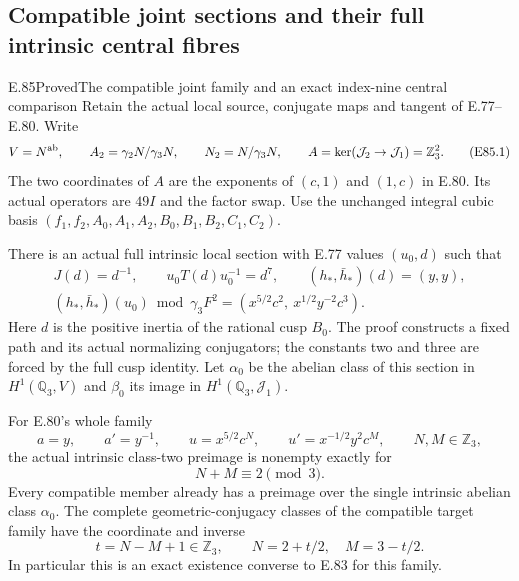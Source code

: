 \subsection{Compatible joint sections and their full intrinsic central fibres}

\begin{statement}{E.85}{Proved}{The compatible joint family and an exact index-nine central comparison}
Retain the actual local source, conjugate maps and
tangent of E.77--E.80. Write
\[
 V=N^{\rm ab},\qquad A_2=\gamma_2N/\gamma_3N,
 \qquad N_2=N/\gamma_3N,\qquad
 A=\ker(\mathcal J_2\to\mathcal J_1)=\mathbb Z_3^2.
 \tag{E85.1}
\]
The two coordinates of $A$ are the exponents of
$(c,1)$ and $(1,c)$ in E.80. Its actual operators
are $49I$ and the factor swap. Use the unchanged
integral cubic basis
$(f_1,f_2,A_0,A_1,A_2,B_0,B_1,B_2,C_1,C_2)$.

There is an actual full intrinsic local section
with E.77 values $(u_0,d)$ such that
\[
 \begin{gathered}
 J(d)=d^{-1},\qquad u_0T(d)u_0^{-1}=d^7,\qquad
 (h_*,\bar h_*)(d)=(y,y),\\
 (h_*,\bar h_*)(u_0)\bmod\gamma_3F^2
       =(x^{5/2}c^2,\ x^{1/2}y^{-2}c^3).
 \end{gathered}
 \tag{E85.2}
\]
Here $d$ is the positive inertia of the rational
cusp $B_0$. The proof constructs a fixed path and
its actual normalizing conjugators; the constants
two and three are forced by the full cusp identity.
Let $\alpha_0$ be the abelian class of this section
in $H^1(\mathbb Q_3,V)$ and $\beta_0$ its image
in $H^1(\mathbb Q_3,\mathcal J_1)$.

For E.80's whole family
\[
 a=y,\qquad a'=y^{-1},\qquad
 u=x^{5/2}c^N,\qquad u'=x^{-1/2}y^2c^M,
                   \qquad N,M\in\mathbb Z_3,
 \tag{E85.3}
\]
the actual intrinsic class-two preimage is nonempty
exactly for
\[
                       N+M\equiv2\pmod3.
 \tag{E85.4}
\]
Every compatible member already has a preimage over
the single intrinsic abelian class $\alpha_0$.
The complete geometric-conjugacy classes of the
compatible target family have the coordinate and
inverse
\[
       t=N-M+1\in\mathbb Z_3,\qquad
       N=2+t/2,\quad M=3-t/2.
 \tag{E85.5}
\]
In particular this is an exact existence converse
to E.83 for this family.


\end{statement}

